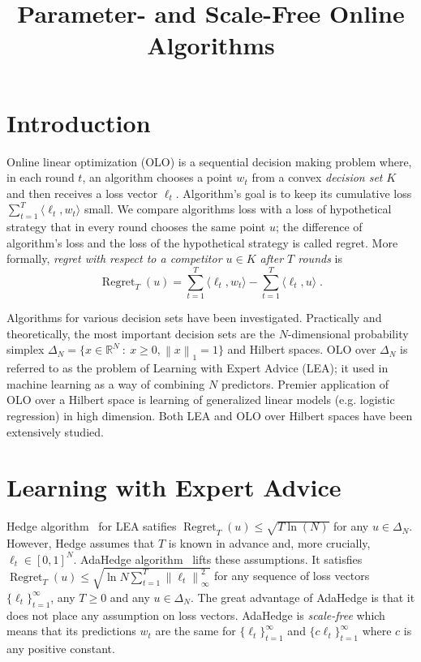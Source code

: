 \documentclass{colt2016} %
\title{Parameter- and Scale-Free Online Algorithms}
\DeclareMathOperator{\Regret}{Regret}
\newcommand{\R}{\mathbb{R}}     %
\newcommand{\norm}[1]{\left\|{#1}\right\|}
\begin{document}
\maketitle

\begin{abstract}

\end{abstract}

\section{Introduction}

Online linear optimization (OLO) is a sequential decision making problem where,
in each round $t$, an algorithm chooses a point $w_t$ from a convex
\emph{decision set} $K$ and then receives a loss vector $\ell_t$. Algorithm's
goal is to keep its cumulative loss $\sum_{t=1}^T \langle \ell_t, w_t \rangle$
small. We compare algorithms loss with a loss of hypothetical strategy that in
every round chooses the same point $u$; the difference of algorithm's  loss and
the loss of the hypothetical strategy is called regret. More formally,
\emph{regret with respect to a competitor $u \in K$ after $T$ rounds} is
$$
\Regret_T(u) = \sum_{t=1}^T \langle \ell_t, w_t \rangle - \sum_{t=1}^T \langle \ell_t, u \rangle \; .
$$

Algorithms for various decision sets have been investigated. Practically and
theoretically, the most important decision sets are the $N$-dimensional
probability simplex $\Delta_N = \{ x \in \R^N ~:~ x \ge 0, \norm{x}_1 = 1\}$ and
Hilbert spaces. OLO over $\Delta_N$ is referred to as the problem of Learning
with Expert Advice (LEA); it used in machine learning as a way of combining $N$
predictors. Premier application of OLO over a Hilbert space is learning of
generalized linear models (e.g. logistic regression) in high dimension.
Both LEA and OLO over Hilbert spaces have been extensively studied.

\section{Learning with Expert Advice}

Hedge algorithm~\cite{} for LEA satifies $\Regret_T(u) \le \sqrt{T \ln(N)}$ for
any $u \in \Delta_N$. However, Hedge assumes that $T$ is known in advance and,
more crucially, $\ell_t \in [0,1]^N$. AdaHedge algorithm~\cite{} lifts these
assumptions. It satisfies $\Regret_T(u) \le \sqrt{\ln N \sum_{t=1}^T
\norm{\ell_t}_\infty^2}$ for any sequence of loss vectors
$\{\ell_t\}_{t=1}^\infty$, any $T \ge 0$ and any $u \in \Delta_N$. The great
advantage of AdaHedge is that it does not place any assumption on loss vectors.
AdaHedge is \emph{scale-free} which means that its predictions $w_t$
are the same for $\{\ell_t\}_{t=1}^\infty$ and $\{c \ell_t\}_{t=1}^\infty$
where $c$ is any positive constant.
\end{document}
